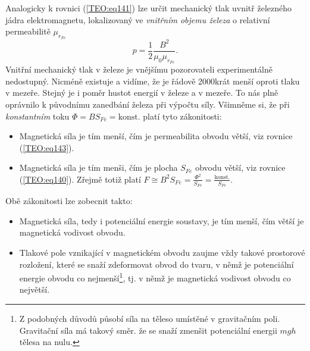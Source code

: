       Analogicky k rovnici (\ref{TEO:eq141}) lze určit mechanický tlak uvnitř železného 
      jádra elektromagnetu, lokalizovaný ve \emph{vnitřním objemu železa} o relativní permeabilitě 
      \(\mu_{r_{Fe}}\)
      \begin{equation}\label{TEO:eq143}
       p = \frac{1}{2}\frac{B^2}{\mu_0\mu_{r_{Fe}}}.
      \end{equation}
      Vnitřní mechanický tlak v železe je vnějšímu pozorovateli experimentálně nedostupný. Nicméně 
      existuje a vidíme, že je řádově 2000krát menší oproti tlaku v mezeře. Stejný je i poměr 
      hustot energií v železe a v mezeře. To nás plně oprávnilo k původnímu zanedbání železa při 
      výpočtu síly. Všimněme si, že při \emph{konstantním} toku \(\Phi = BS_{Fe} = \text{konst}\). 
      platí tyto zákonitosti:
      \begin{itemize}[noitemsep]
        \item Magnetická síla je tím menší, čím je permeabilita obvodu větší, viz rovnice     
              (\ref{TEO:eq143}).
        \item Magnetická síla je tím menši, čím je plocha \(S_{Fe}\) obvodu větší, viz rovnice 
              (\ref{TEO:eq140}). Zřejmě totiž platí \(F \cong B^2S_{Fe} = 
              \frac{\Phi^2}{S_{Fe}} = \frac{\text{konst.}}{S_{Fe}}\).
      \end{itemize}
      Obě zákonitosti lze zobecnit takto:
      \begin{itemize}[noitemsep]
        \item Magnetická síla, tedy i potenciální energie soustavy, je tím menší, čím větší je    
              magnetická vodivost obvodu.
        \item Tlakové pole vznikající v magnetickém obvodu zaujme vždy takové prostorové rozložení, 
              které se snaží zdeformovat obvod do tvaru, v němž je potenciální energie obvodu co 
              nejmenší\footnote{Z podobných důvodů působí síla na těleso umístěné v gravitačním 
              poli. Gravitační síla má takový směr. že se snaží zmenšit potenciální energii \(mgh\) 
              tělesa na nulu.}, tj. v němž je magnetická vodivost obvodu co největší.
      \end{itemize}
      
